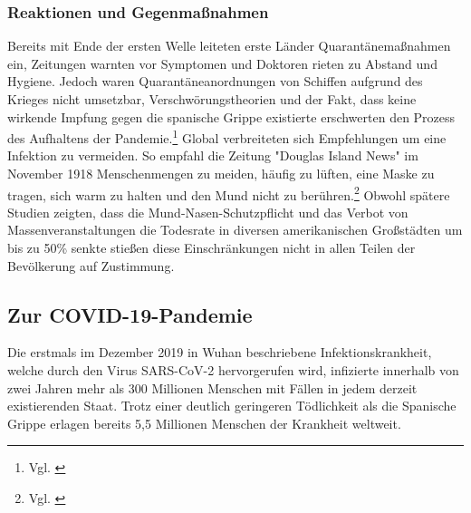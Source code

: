 \documentclass[12pt]{article}
\begin{document}
\subsubsection{Reaktionen und Gegenmaßnahmen}
Bereits mit Ende der ersten Welle leiteten erste Länder Quarantänemaßnahmen ein, Zeitungen warnten vor Symptomen und Doktoren rieten zu Abstand und Hygiene. Jedoch waren Quarantäneanordnungen von Schiffen aufgrund des Krieges nicht umsetzbar, Verschwörungstheorien und der Fakt, dass keine wirkende Impfung gegen die spanische Grippe existierte erschwerten den Prozess des Aufhaltens der Pandemie.\footnote{Vgl. \cite{Hist10}} Global verbreiteten sich Empfehlungen um eine Infektion zu vermeiden. So empfahl die Zeitung "Douglas Island News" im November 1918 Menschenmengen zu meiden, häufig zu lüften, eine Maske zu tragen, sich warm zu halten und den Mund nicht zu berühren.\footnote{Vgl. \cite{Mai2021}} Obwohl spätere Studien zeigten, dass die Mund-Nasen-Schutzpflicht und das Verbot von Massenveranstaltungen die Todesrate in diversen amerikanischen Großstädten um bis zu 50\% senkte stießen diese Einschränkungen nicht in allen Teilen der Bevölkerung auf Zustimmung.

\subsection{Zur COVID-19-Pandemie}
Die erstmals im Dezember 2019 in Wuhan beschriebene Infektionskrankheit, welche durch den Virus SARS-CoV-2 hervorgerufen wird, infizierte innerhalb von zwei Jahren mehr als 300 Millionen Menschen mit Fällen in jedem derzeit existierenden Staat. Trotz einer deutlich geringeren Tödlichkeit als die Spanische Grippe erlagen bereits 5,5 Millionen Menschen der Krankheit weltweit. 
\end{document}
